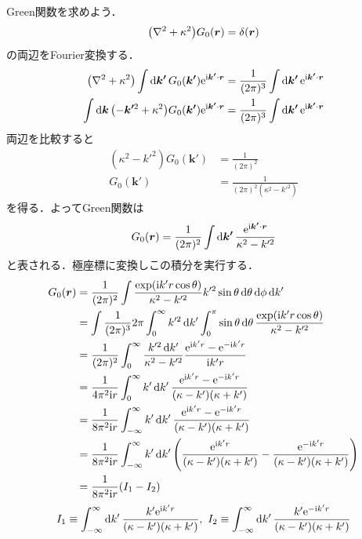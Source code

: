 \documentclass{report}
\begin{document}
  Green関数を求めよう．
  \begin{align}
    \qty(\nabla^2 + \kappa^2)G_0(\bm{r}) = \delta(\bm{r})
  \end{align}
  の両辺をFourier変換する．
  \begin{align}
    \qty(\nabla^2 + \kappa^2)\int \dd{\bm{k'}} G_0(\bm{k'}) \mathrm{e}^{\mathrm{i}\bm{k'}\cdot \bm{r}} &= \frac{1}{(2\pi)^3}\int \dd{\bm{k'}} \mathrm{e}^{\mathrm{i}\bm{k'}\cdot\bm{r}}\\
    \int \dd{\bm{k}} \qty(-\bm{k'}^2 + \kappa^2)G_0(\bm{k'}) \mathrm{e}^{\mathrm{i} \bm{k'}\cdot \bm{r}} &= \frac{1}{(2\pi)^3} \int \dd{\bm{k'}} \mathrm{e}^{\mathrm{i} \bm{k'}\cdot \bm{r}}
  \end{align}
  両辺を比較すると
  \begin{align}
    (\kappa^2 - k'^2)G_0(\bm{k'}) &= \frac{1}{(2\pi)^2}\\
    G_0(\bm{k'}) &= \frac{1}{(2\pi)^2 (\kappa^2 - k'^2)}
  \end{align}
  を得る．よってGreen関数は
  \begin{align}
    G_0(\bm{r}) = \frac{1}{(2\pi)^2}\int \dd{\bm{k'}} \frac{\mathrm{e}^{\mathrm{i}\bm{k'}\cdot\bm{r}}}{\kappa^2 - k'^2}
  \end{align}
  と表される．極座標に変換しこの積分を実行する．
  \begin{align}
    G_0(\bm{r}) &= \frac{1}{(2\pi)^2} \int \frac{\exp(\mathrm{i} k' r \cos \theta)}{\kappa^2 - k'^2}k'^2\sin\theta\dd{\theta}\dd{\phi}\dd{k'}\\
    &= \int \frac{1}{(2\pi)^3}2\pi \int_{0}^{\infty} k'^2 \dd{k'} \int_{0}^{\pi}\sin\theta\dd{\theta}\frac{\exp(\mathrm{i} k' r\cos\theta)}{\kappa^2 - k'^2}\\
    &= \frac{1}{(2\pi)^2} \int_{0}^{\infty} \frac{k'^2\dd{k'}}{\kappa^2 - k'^2}\frac{\mathrm{e}^{\mathrm{i} k'r} - \mathrm{e}^{-\mathrm{i} k'r}}{\mathrm{i} k'r}\\
    &= \frac{1}{4\pi^2\mathrm{i} r} \int_{0}^{\infty} k' \dd{k'} \frac{\mathrm{e}^{\mathrm{i} k'r} - \mathrm{e}^{-\mathrm{i} k'r}}{(\kappa - k')(\kappa + k')}\\
    &= \frac{1}{8\pi^2\mathrm{i} r} \int_{-\infty}^{\infty}k' \dd{k'} \frac{\mathrm{e}^{\mathrm{i} k'r} - \mathrm{e}^{-\mathrm{i} k'r}}{(\kappa - k')(\kappa + k')}\\
    &= \frac{1}{8\pi^2\mathrm{i} r} \int_{-\infty}^{\infty} k' \dd{k'} \qty(\frac{\mathrm{e}^{\mathrm{i} k'r}}{(\kappa - k')(\kappa + k')} - \frac{\mathrm{e}^{-\mathrm{i} k'r}}{(\kappa - k')(\kappa + k')})\\
    &= \frac{1}{8\pi^2 \mathrm{i} r}\qty(I_1 - I_2)
  \end{align}
  \begin{align}
    I_1 \equiv \int_{-\infty}^{\infty} \dd{k'} \frac{k' \mathrm{e}^{\mathrm{i} k'r}}{(\kappa - k')(\kappa + k')},\ I_2 \equiv \int_{-\infty}^{\infty} \dd{k'} \frac{k' \mathrm{e}^{-\mathrm{i} k'r}}{(\kappa - k')(\kappa + k')}
  \end{align}
\end{document}
